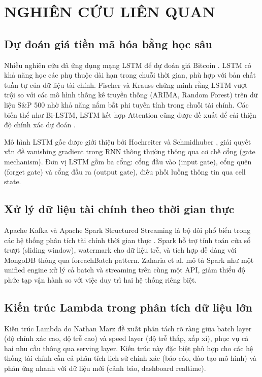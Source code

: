 \documentclass[12pt, a4paper]{report}
\begin{document}
\chapter{NGHIÊN CỨU LIÊN QUAN}

\section{Dự đoán giá tiền mã hóa bằng học sâu}

Nhiều nghiên cứu đã ứng dụng mạng LSTM để dự đoán giá Bitcoin \cite{ref1}. LSTM có khả năng học các phụ thuộc dài hạn trong chuỗi thời gian, phù hợp với bản chất tuần tự của dữ liệu tài chính. Fischer và Krauss \cite{ref1} chứng minh rằng LSTM vượt trội so với các mô hình thống kê truyền thống (ARIMA, Random Forest) trên dữ liệu S\&P 500 nhờ khả năng nắm bắt phi tuyến tính trong chuỗi tài chính. Các biến thể như Bi-LSTM, LSTM kết hợp Attention cũng được đề xuất để cải thiện độ chính xác dự đoán \cite{ref5}.

Mô hình LSTM gốc được giới thiệu bởi Hochreiter và Schmidhuber \cite{ref4}, giải quyết vấn đề vanishing gradient trong RNN thông thường thông qua cơ chế cổng (gate mechanism). Đơn vị LSTM gồm ba cổng: cổng đầu vào (input gate), cổng quên (forget gate) và cổng đầu ra (output gate), điều phối luồng thông tin qua cell state.

\section{Xử lý dữ liệu tài chính theo thời gian thực}

Apache Kafka và Apache Spark Structured Streaming là bộ đôi phổ biến trong các hệ thống phân tích tài chính thời gian thực \cite{ref2}. Spark hỗ trợ tính toán cửa sổ trượt (sliding window), watermark cho dữ liệu trễ, và tích hợp dễ dàng với MongoDB thông qua foreachBatch pattern. Zaharia et al. \cite{ref2} mô tả Spark như một unified engine xử lý cả batch và streaming trên cùng một API, giảm thiểu độ phức tạp vận hành so với việc duy trì hai hệ thống riêng biệt.

\section{Kiến trúc Lambda trong phân tích dữ liệu lớn}

Kiến trúc Lambda \cite{ref3} do Nathan Marz đề xuất phân tách rõ ràng giữa batch layer (độ chính xác cao, độ trễ cao) và speed layer (độ trễ thấp, xấp xỉ), phục vụ cả hai nhu cầu thông qua serving layer. Kiến trúc này đặc biệt phù hợp cho các hệ thống tài chính cần cả phân tích lịch sử chính xác (báo cáo, đào tạo mô hình) và phản ứng nhanh với dữ liệu mới (cảnh báo, dashboard realtime).
\end{document}
